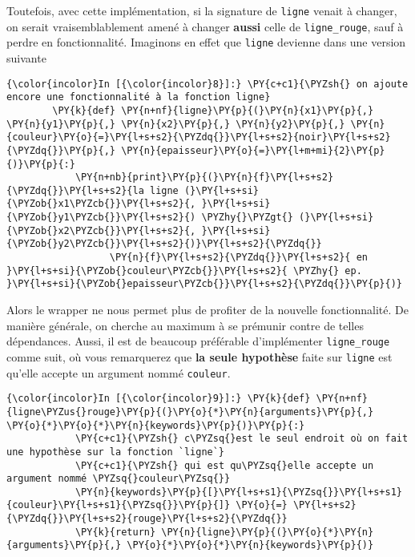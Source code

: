     Toutefois, avec cette implémentation, si la signature de \texttt{ligne}
venait à changer, on serait vraisemblablement amené à changer
\textbf{aussi} celle de \texttt{ligne\_rouge}, sauf à perdre en
fonctionnalité. Imaginons en effet que \texttt{ligne} devienne dans une
version suivante

    \begin{Verbatim}[commandchars=\\\{\}]
{\color{incolor}In [{\color{incolor}8}]:} \PY{c+c1}{\PYZsh{} on ajoute encore une fonctionnalité à la fonction ligne}
        \PY{k}{def} \PY{n+nf}{ligne}\PY{p}{(}\PY{n}{x1}\PY{p}{,} \PY{n}{y1}\PY{p}{,} \PY{n}{x2}\PY{p}{,} \PY{n}{y2}\PY{p}{,} \PY{n}{couleur}\PY{o}{=}\PY{l+s+s2}{\PYZdq{}}\PY{l+s+s2}{noir}\PY{l+s+s2}{\PYZdq{}}\PY{p}{,} \PY{n}{epaisseur}\PY{o}{=}\PY{l+m+mi}{2}\PY{p}{)}\PY{p}{:}
            \PY{n+nb}{print}\PY{p}{(}\PY{n}{f}\PY{l+s+s2}{\PYZdq{}}\PY{l+s+s2}{la ligne (}\PY{l+s+si}{\PYZob{}x1\PYZcb{}}\PY{l+s+s2}{, }\PY{l+s+si}{\PYZob{}y1\PYZcb{}}\PY{l+s+s2}{) \PYZhy{}\PYZgt{} (}\PY{l+s+si}{\PYZob{}x2\PYZcb{}}\PY{l+s+s2}{, }\PY{l+s+si}{\PYZob{}y2\PYZcb{}}\PY{l+s+s2}{)}\PY{l+s+s2}{\PYZdq{}}
                  \PY{n}{f}\PY{l+s+s2}{\PYZdq{}}\PY{l+s+s2}{ en }\PY{l+s+si}{\PYZob{}couleur\PYZcb{}}\PY{l+s+s2}{ \PYZhy{} ep. }\PY{l+s+si}{\PYZob{}epaisseur\PYZcb{}}\PY{l+s+s2}{\PYZdq{}}\PY{p}{)}
\end{Verbatim}


    Alors le wrapper ne nous permet plus de profiter de la nouvelle
fonctionnalité. De manière générale, on cherche au maximum à se prémunir
contre de telles dépendances. Aussi, il est de beaucoup préférable
d'implémenter \texttt{ligne\_rouge} comme suit, où vous remarquerez que
\textbf{la seule hypothèse} faite sur \texttt{ligne} est qu'elle accepte
un argument nommé \texttt{couleur}.

    \begin{Verbatim}[commandchars=\\\{\}]
{\color{incolor}In [{\color{incolor}9}]:} \PY{k}{def} \PY{n+nf}{ligne\PYZus{}rouge}\PY{p}{(}\PY{o}{*}\PY{n}{arguments}\PY{p}{,} \PY{o}{*}\PY{o}{*}\PY{n}{keywords}\PY{p}{)}\PY{p}{:}
            \PY{c+c1}{\PYZsh{} c\PYZsq{}est le seul endroit où on fait une hypothèse sur la fonction `ligne`}
            \PY{c+c1}{\PYZsh{} qui est qu\PYZsq{}elle accepte un argument nommé \PYZsq{}couleur\PYZsq{}}
            \PY{n}{keywords}\PY{p}{[}\PY{l+s+s1}{\PYZsq{}}\PY{l+s+s1}{couleur}\PY{l+s+s1}{\PYZsq{}}\PY{p}{]} \PY{o}{=} \PY{l+s+s2}{\PYZdq{}}\PY{l+s+s2}{rouge}\PY{l+s+s2}{\PYZdq{}}
            \PY{k}{return} \PY{n}{ligne}\PY{p}{(}\PY{o}{*}\PY{n}{arguments}\PY{p}{,} \PY{o}{*}\PY{o}{*}\PY{n}{keywords}\PY{p}{)}
\end{Verbatim}


